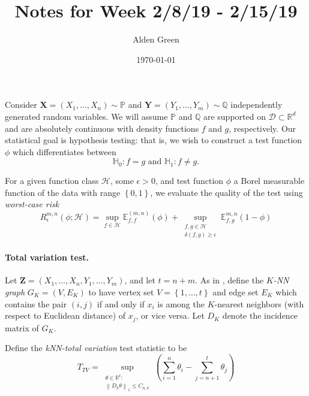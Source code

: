 \documentclass{article}
\newcommand{\Reals}{\mathbb{R}}
\newcommand{\norm}[1]{\left\lVert#1\right\rVert}
\newcommand{\set}[1]{\left\{#1\right\}}
\newcommand{\1}{\mathbb{I}}
\newcommand{\D}{\mathcal{D}}
\newcommand{\Xbf}{\mathbf{X}}
\newcommand{\Ybf}{\mathbf{Y}}
\newcommand{\Zbf}{\mathbf{Z}}
\newcommand{\Hclass}{\mathcal{H}}
\newcommand{\Pbb}{\mathbb{P}}
\newcommand{\Ebb}{\mathbb{E}}
\newcommand{\Qbb}{\mathbb{Q}}
\theoremstyle{alden}
\theoremstyle{aldenthm}
\theoremstyle{definition}
\theoremstyle{remark}
\begin{document}
\title{Notes for Week 2/8/19 - 2/15/19}
\author{Alden Green}
\date{\today}
\maketitle

Consider $\Xbf = (X_1, \ldots, X_n) \sim \Pbb$ and $\Ybf = (Y_1, \ldots, Y_m) \sim \Qbb$ independently generated random variables. We will assume $\Pbb$ and $\Qbb$ are supported on $\D \subset \Reals^d$ and are absolutely continuous with density functions $f$ and $g$, respectively. Our statistical goal is hypothesis testing: that is, we wish to construct a test function $\phi$ which differentiates between
\begin{equation*}
\mathbb{H}_0: f = g \text{ and } \mathbb{H}_1: f \neq g.
\end{equation*}

For a given function class $\Hclass$, some $\epsilon > 0$, and test function $\phi$ a Borel measurable function of the data with range $\set{0,1}$, we evaluate the quality of the test using \emph{worst-case risk}
\begin{equation*}
R_{\epsilon}^{m,n}(\phi; \Hclass) = \sup_{f \in \Hclass} \Ebb_{f,f}^{(m,n)}(\phi) + \sup_{ \substack{f,g \in \Hclass \\ \delta(f,g) \geq \epsilon } } \Ebb_{f,g}^{m,n}(1 - \phi)
\end{equation*} 

\paragraph{Total variation test.}

Let $\Zbf = (X_1, \ldots, X_n, Y_1, \ldots, Y_m)$, and let $t = n + m$. As in \citep{padilla2018}, define the \emph{$K$-NN graph} $G_K = (V,E_K)$ to have vertex set $V = \set{1, \ldots, t}$ and edge set $E_K$ which contains the pair $(i,j)$ if and only if $x_i$ is among the $K$-nearest neighbors (with respect to Euclidean distance) of $x_j$, or vice versa. Let $D_K$ denote the incidence matrix of $G_K$. 

Define the \emph{kNN-total variation} test statistic to be
\begin{equation}
\label{eqn: knn_tv_test_statistic}
T_{TV} = \sup_{\substack{\theta \in \Reals^{t}: \\ \norm{D_{k} \theta}_1 \leq C_{n,k}} } \left(\sum_{i = 1}^{n} \theta_i - \sum_{j = n+1}^{t} \theta_j\right)
\end{equation}
\end{document}
